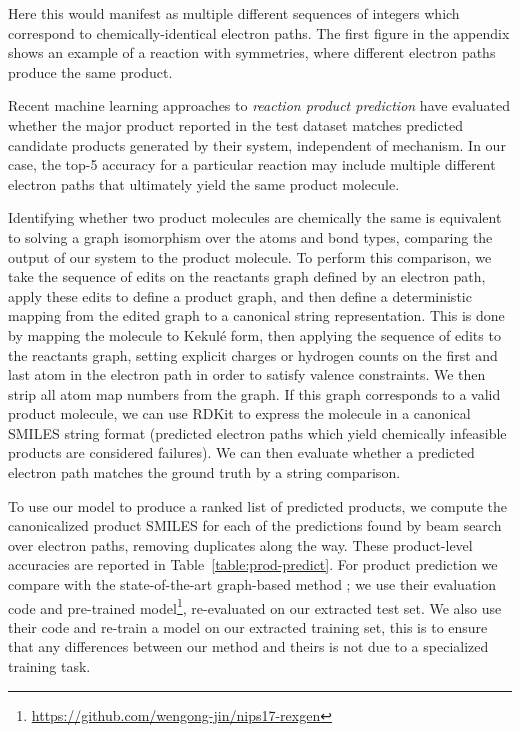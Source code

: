 Here this would manifest as multiple different sequences of integers which correspond to chemically-identical electron paths. 
The first figure in the appendix shows an example of a reaction with symmetries, where different electron paths produce the same product. 

Recent machine learning approaches to {\em reaction product prediction} \citep{jin2017predicting,schwaller2017found}
have evaluated whether the major product reported in the test dataset matches predicted candidate products generated by their system, independent of mechanism.
In our case, the top-5 accuracy for a particular reaction may include multiple different electron paths that ultimately yield the same product molecule.

Identifying whether two product molecules are chemically the same is equivalent to solving a graph isomorphism over the atoms and bond types, comparing the output of our system to the product molecule.
To perform this comparison, we take the sequence of edits on the reactants graph defined by an electron path,  
apply these edits to define a product graph, 
and then define a deterministic mapping from the edited graph to a canonical string representation.
This is done by mapping the molecule to Kekul\'e form, 
then applying the sequence of edits to the reactants graph,
setting explicit charges or hydrogen counts on the first and last atom in the electron path in order to satisfy valence constraints.
We then strip all atom map numbers from the graph.
If this graph corresponds to a valid product molecule, we can use RDKit to express the molecule in a canonical SMILES string format 
(predicted electron paths which yield chemically infeasible products are considered failures).
We can then evaluate whether a predicted electron path matches the ground truth by a string comparison.

To use our model to produce a ranked list of predicted products, we compute the canonicalized product SMILES for each of the predictions found by beam search over electron paths, removing duplicates along the way. 
These product-level accuracies are reported in Table~\ref{table:prod-predict}.
For product prediction we compare with the state-of-the-art graph-based method \cite{jin2017predicting};
we use their evaluation code and pre-trained model\footnote{\url{https://github.com/wengong-jin/nips17-rexgen}},
re-evaluated on our extracted test set. 
We also use their code and re-train a model on our extracted training set, this is to ensure that any differences between our method and theirs is not due to a specialized training task.


